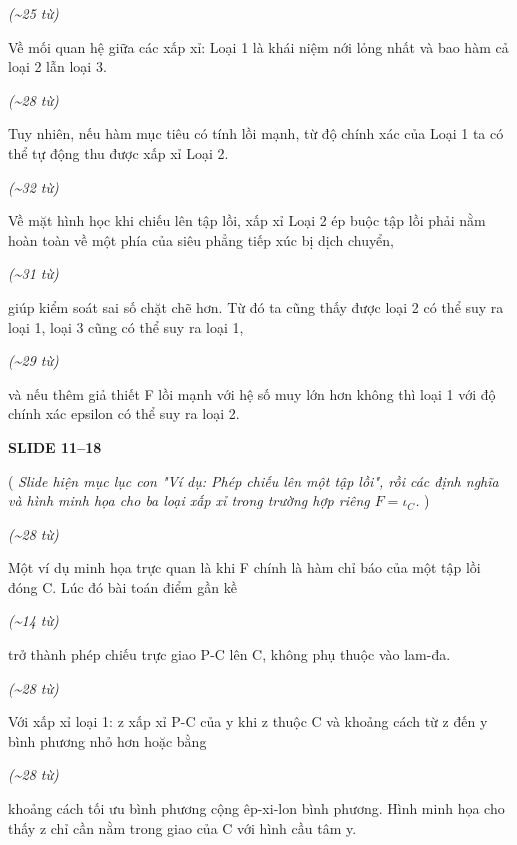 ﻿\documentclass[12pt]{article}
\newcommand{\scene}[1]{
    \vspace{18pt}
    \normalsize
    \noindent\textbf{\MakeUppercase{#1}}
    \vspace{12pt}
}
\newcommand{\action}[1]{
    \vspace{6pt}
    \small
    \noindent(\textit{#1})
    \vspace{6pt}
}
\newenvironment{speech}{
    \normalsize
    \begin{list}{}{
        \leftmargin=1.25in
        \rightmargin=1.25in
        \parsep=0pt
        \topsep=0pt
        \partopsep=0pt
    }
    \item[]
}{
    \end{list}
    \vspace{6pt}
}
\newcommand{\block}[1]{
    \vspace{4pt}
    \noindent\hspace{1.5in}\textit{(\textasciitilde #1 từ)}
}
\begin{document}
\block{25}
\begin{speech}
    Về mối quan hệ giữa các xấp xỉ: Loại 1 là khái niệm nới lỏng nhất và bao hàm cả loại 2 lẫn loại 3.
\end{speech}

\block{28}
\begin{speech}
    Tuy nhiên, nếu hàm mục tiêu có tính lồi mạnh, từ độ chính xác của Loại 1 ta có thể tự động thu được xấp xỉ Loại 2.
\end{speech}

\block{32}
\begin{speech}
    Về mặt hình học khi chiếu lên tập lồi, xấp xỉ Loại 2 ép buộc tập lồi phải nằm hoàn toàn về một phía của siêu phẳng tiếp xúc bị dịch chuyển,
\end{speech}

\block{31}
\begin{speech}
    giúp kiểm soát sai số chặt chẽ hơn. Từ đó ta cũng thấy được loại 2 có thể suy ra loại 1, loại 3 cũng có thể suy ra loại 1,
\end{speech}

\block{29}
\begin{speech}
    và nếu thêm giả thiết F lồi mạnh với hệ số muy lớn hơn không thì loại 1 với độ chính xác epsilon có thể suy ra loại 2.
\end{speech}

\scene{SLIDE 11--18}

\action{
    Slide hiện mục lục con "Ví dụ: Phép chiếu lên một tập lồi", rồi các định nghĩa và hình minh họa cho ba loại xấp xỉ trong trường hợp riêng $F=\iota_C$.
}

\block{28}
\begin{speech}
    Một ví dụ minh họa trực quan là khi F chính là hàm chỉ báo của một tập lồi đóng C. Lúc đó bài toán điểm gần kề
\end{speech}

\block{14}
\begin{speech}
    trở thành phép chiếu trực giao P-C lên C, không phụ thuộc vào lam-đa.
\end{speech}

\block{28}
\begin{speech}
    Với xấp xỉ loại 1: z xấp xỉ P-C của y khi z thuộc C và khoảng cách từ z đến y bình phương nhỏ hơn hoặc bằng
\end{speech}

\block{28}
\begin{speech}
    khoảng cách tối ưu bình phương cộng êp-xi-lon bình phương. Hình minh họa cho thấy z chỉ cần nằm trong giao của C với hình cầu tâm y.
\end{speech}
\end{document}
